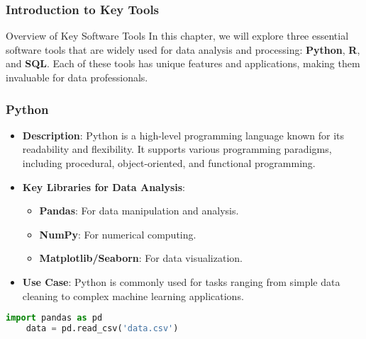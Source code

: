 \documentclass[aspectratio=169]{beamer}
\begin{document}
\frame{\titlepage}

\begin{frame}[fragile]
    \frametitle{Introduction to Key Tools}
    \begin{block}{Overview of Key Software Tools}
        In this chapter, we will explore three essential software tools that are widely used for data analysis and processing: 
        \textbf{Python}, \textbf{R}, and \textbf{SQL}. Each of these tools has unique features and applications, making them invaluable for data professionals.
    \end{block}
\end{frame}

\begin{frame}[fragile]
    \frametitle{Python}
    \begin{itemize}
        \item \textbf{Description}: Python is a high-level programming language known for its readability and flexibility. 
        It supports various programming paradigms, including procedural, object-oriented, and functional programming.
        
        \item \textbf{Key Libraries for Data Analysis}:
        \begin{itemize}
            \item \textbf{Pandas}: For data manipulation and analysis.
            \item \textbf{NumPy}: For numerical computing.
            \item \textbf{Matplotlib/Seaborn}: For data visualization.
        \end{itemize}

        \item \textbf{Use Case}: Python is commonly used for tasks ranging from simple data cleaning to complex machine learning applications.
    \end{itemize}

    \begin{lstlisting}[language=Python]
    import pandas as pd
    data = pd.read_csv('data.csv')
    \end{lstlisting}
\end{frame}
\end{document}
